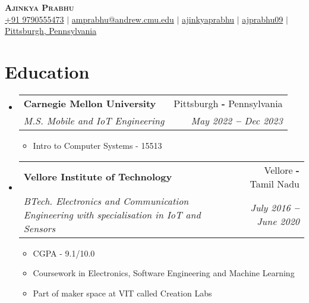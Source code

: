 \documentclass{article}
\makeatletter
\newcommand{\resumeItem}[1]{
  \item\small{
    {#1 \vspace{-2pt}}
  }
}
\newcommand{\resumeSubheading}[4]{
  \vspace{-1pt}\item
    \begin{tabular*}{0.97\textwidth}[t]{l@{\extracolsep{\fill}}r}
      \textbf{#1} & #2 \\
      \textit{\small#3} & \textit{\small #4} \\
    \end{tabular*}\vspace{-7pt}
}
\newcommand{\resumeSubHeadingListStart}{\begin{itemize}[leftmargin=0.15in, label={}]}
\newcommand{\resumeSubHeadingListEnd}{\end{itemize}}
\newcommand{\resumeItemListStart}{\begin{itemize}}
\newcommand{\resumeItemListEnd}{\end{itemize}\vspace{-6pt}}
\makeatother
\begin{document}

\begin{flushleft}
    \textbf{\large \scshape Ajinkya Prabhu} \\ \vspace{2 pt}
    \small
    \faMobile \hspace{.5pt} \href{tel:919790555473}{+91 9790555473}
    $|$
    \faAt \hspace{.5pt} \href{mailto:amprabhu@andrew.cmu.edu}{amprabhu@andrew.cmu.edu}
    $|$
    \faLinkedinSquare \hspace{.5pt} \href{https://www.linkedin.com/in/ajinkyaprabhu/}{ajinkyaprabhu}
    $|$
    \faGithub \hspace{.5pt} \href{https://github.com/ajprabhu09}{ajprabhu09}
    $|$
    \faMapMarker \hspace{.5pt} \href{a} {Pittsburgh, Pennsylvania}
\end{flushleft}




    
   
\section{Education}
  \vspace*{1pt}
    \resumeSubHeadingListStart
  
    \resumeSubheading
      {Carnegie Mellon University}{Pittsburgh \textbf{-} Pennsylvania}
      {M.S. Mobile and IoT Engineering}{May 2022 \textbf{--} Dec 2023}
        \resumeItemListStart
            \resumeItem{Intro to Computer Systems - 15513}
        \resumeItemListEnd
    
    \resumeSubheading
      {Vellore Institute of Technology}{Vellore \textbf{-} Tamil Nadu}
      {BTech. Electronics and Communication Engineering with specialisation in IoT and Sensors}{July 2016 \textbf{--} June 2020}
        \resumeItemListStart
            \resumeItem{CGPA - 9.1/10.0}
            \resumeItem{Coursework in Electronics, Software Engineering and Machine Learning}
            \resumeItem{Part of maker space at VIT called Creation Labs}
        \resumeItemListEnd
    \resumeSubHeadingListEnd
\end{document}
